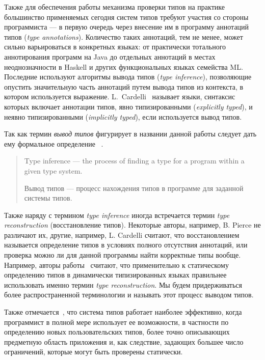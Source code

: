 Также для обеспечения работы механизма проверки типов на практике большинство
применяемых сегодня систем типов требуют участия со стороны программиста --- в
первую очередь через внесение им в программу аннотаций типов (\emph{type
  annotations}). Количество таких аннотаций, тем не менее, может сильно
варьироваться в конкретных языках: от практически тотального аннотирования
программ на Java до отдельных аннотаций в местах неоднозначности в Haskell и
других функциональных языках семейства ML. Последние используют алгоритмы вывода
типов (\emph{type inference}), позволяющие опустить значительную часть аннотаций
путем вывода типов из контекста, в котором используется выражение.  
L.~Cardelli~\cite{Cardelli2004} называет языки, синтаксис которых включает
аннотации типов, явно типизированными (\emph{explicitly typed}), и неявно
типизированными (\emph{implicitly typed}), если используется вывод типов.

Так как термин \emph{вывод типов} фигурирует в названии данной работы следует
дать ему формальное определение~\cite{Cardelli2004} .

\begin{quote}
  Type inference --- the process of finding a type for a program within a
  given type system.
  
  Вывод типов --- процесс нахождения типов в программе для заданной системы
  типов. 
\end{quote}


Также наряду с термином \emph{type inference} иногда встречается термин
\emph{type reconstruction} (восстановление типов). Некоторые авторы, например,
B. Pierce не различают их, другие, например, L. Cardelli считают, что
восстановлением называется определение типов в условиях полного отсутствия
аннотаций, или проверка можно ли для данной программы найти корректные типы
вообще. 
Например, авторы работы~\cite{Pluquet2009} считают, что применительно
к статическому определению типов в динамически типизированных языках
правильнее использовать именно термин \emph{type reconstruction}. Мы будем
придерживаться более распространенной терминологии и называть этот процесс
выводом типов.

Также отмечается~\cite{Pierce2002}, что система типов работает наиболее
эффективно, когда программист в полной мере использует ее возможности, в
частности по определению новых пользовательских типов, более точно описывающих
предметную область приложения и, как следствие, задающих большее число
ограничений, которые могут быть проверены статически.

